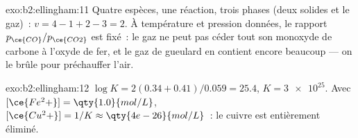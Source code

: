 \begin{solution}{exo:b2:ellingham:11}
Quatre espèces, une réaction, trois phases (deux solides et le gaz)~: $v = 4 - 1 +
2 - 3 = 2$. À température et pression données, le rapport $p_{\ce{CO}}/p_{\ce{CO2}}$
est fixé~: le gaz ne peut pas céder tout son monoxyde de carbone à l'oxyde de fer,
et le gaz de gueulard en contient encore beaucoup --- on le brûle pour préchauffer
l'air.
\end{solution}

\begin{solution}{exo:b2:ellingham:12}
$\log K = 2(0.34 + 0.41)/0.059 = 25.4$, $K = \num{3e25}$. Avec
$[\ce{Fe^2+}] = \qty{1.0}{mol/L}$, $[\ce{Cu^2+}] = 1/K \approx
\qty{4e-26}{mol/L}$~: le cuivre est entièrement éliminé.
\end{solution}

